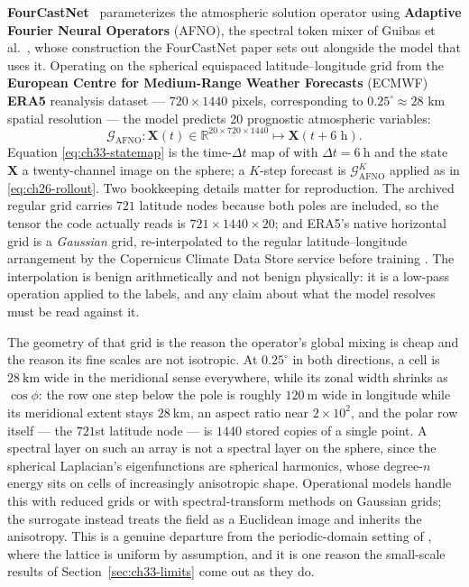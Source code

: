 \textbf{FourCastNet}~\cite{pathak2022fourcastnet} parameterizes the atmospheric solution
operator using \textbf{Adaptive Fourier Neural Operators} (AFNO), the spectral token mixer
of Guibas et al.~\cite{guibas2021afno}, whose construction the FourCastNet paper sets out
alongside the model that uses it. Operating on
the spherical equispaced latitude--longitude grid from the \textbf{European Centre for
Medium-Range Weather Forecasts} (ECMWF) \textbf{ERA5} reanalysis dataset
\cite{pathak2022fourcastnet,hersbach2020era5} --- $720 \times 1440$ pixels, corresponding to
$0.25^\circ \approx 28 \text{ km}$ spatial resolution --- the model predicts 20 prognostic
atmospheric variables:
\begin{equation}
  \label{eq:ch33-statemap}
  \mathcal{G}_{\text{AFNO}} : \mathbf{X}(t) \in \mathbb{R}^{20 \times 720 \times 1440} \longmapsto \mathbf{X}(t + 6\text{ h}).
\end{equation}
Equation \eqref{eq:ch33-statemap} is the time-$\Delta t$ map of
 with $\Delta t = 6\ \mathrm{h}$
and the state $\mathbf{X}$ a twenty-channel image on the sphere; a $K$-step forecast is
$\mathcal{G}_{\text{AFNO}}^{K}$ applied as in \eqref{eq:ch26-rollout}. Two bookkeeping
details matter for reproduction. The archived regular grid carries $721$ latitude nodes
because both poles are included, so the tensor the code actually reads is
$721 \times 1440 \times 20$; and ERA5's native horizontal grid is a \emph{Gaussian} grid,
re-interpolated to the regular latitude--longitude arrangement by the Copernicus Climate
Data Store service before training \cite{pathak2022fourcastnet}. The interpolation is
benign arithmetically and not benign physically: it is a low-pass operation applied to the
labels, and any claim about what the model resolves must be read against it. 

The geometry of that grid is the reason the operator's global mixing is cheap and the
reason its fine scales are not isotropic. At $0.25^\circ$ in both directions, a cell is
$28\ \mathrm{km}$ wide in the meridional sense everywhere, while its zonal width shrinks as
$\cos\phi$: the row one step below the pole is roughly $120\ \mathrm{m}$ wide in longitude
while its meridional extent stays $28\ \mathrm{km}$, an aspect ratio near $2\times10^{2}$, and
the polar row itself --- the $721$st latitude node --- is $1440$ stored copies of a single
point.
A spectral layer on such an array is not a spectral layer on the
sphere, since the spherical Laplacian's eigenfunctions are spherical harmonics, whose
degree-$n$ energy sits on cells of increasingly anisotropic shape. Operational models
handle this with reduced grids or with spectral-transform methods on Gaussian grids; the
surrogate instead treats the field as a Euclidean image and inherits the anisotropy. This
is a genuine departure from the periodic-domain setting of
, where the lattice is uniform
by assumption, and it is one reason the small-scale results of
Section~\ref{sec:ch33-limits} come out as they do. 

